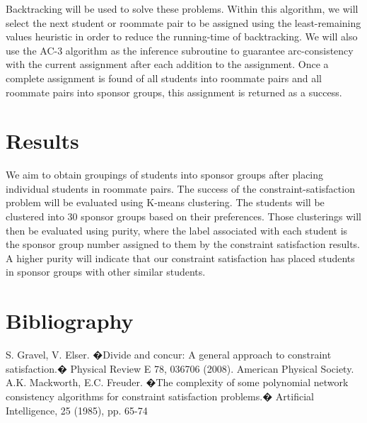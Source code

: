 \documentclass[letterpaper]{article}
\begin{document}
Backtracking will be used to solve these problems. Within this algorithm, we will select the next student or roommate pair to be assigned using the least-remaining values heuristic in order to reduce the running-time of backtracking. We will also use the AC-3 algorithm as the inference subroutine to guarantee arc-consistency with the current assignment after each addition to the assignment. Once a complete assignment is found of all students into roommate pairs and all roommate pairs into sponsor groups, this assignment is returned as a success.

\section{Results}
We aim to obtain groupings of students into sponsor groups after placing individual students in roommate pairs. 
The success of the constraint-satisfaction problem will be evaluated using K-means clustering. The students will be clustered into 30 sponsor groups based on their preferences. Those clusterings will then be evaluated using purity, where the label associated with each student is the sponsor group number assigned to them by the constraint satisfaction results. A higher purity will indicate that our constraint satisfaction has placed students in sponsor groups with other similar students.

\section{Bibliography}

S. Gravel, V. Elser. �Divide and concur: A general approach to constraint satisfaction.� Physical Review E 78, 036706 (2008). American Physical Society.  \\

\noindent A.K. Mackworth, E.C. Freuder. �The complexity of some polynomial network consistency algorithms for constraint satisfaction problems.� Artificial Intelligence, 25 (1985), pp. 65-74
\end{document}
